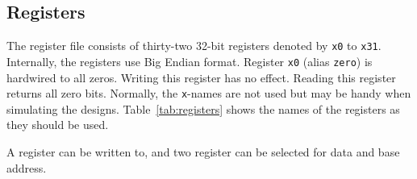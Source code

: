 \documentclass[12pt]{article}
\begin{document}
%
%
%
%
%



\subsection{Registers}
The register file consists of thirty-two 32-bit registers denoted by \texttt{x0} to \texttt{x31}. Internally, the registers use Big Endian format. Register \texttt{x0} (alias \texttt{zero}) is hardwired to all zeros. Writing this register has no effect. Reading this register returns all zero bits. Normally, the \texttt{x}-names are not used but may be handy when simulating the designs. Table~\ref{tab:registers} shows the names of the registers as they should be used.

A register can be written to, and two register can be selected for data and base address.
\end{document}
